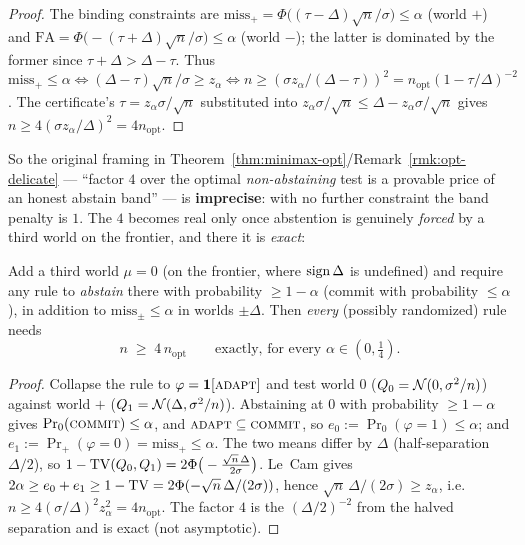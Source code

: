 \begin{proof}
The binding constraints are $\mathrm{miss}_+=\Phi\big((\tau-\Delta)\sqrt n/\sigma\big)\le\alpha$
(world $+$) and $\mathrm{FA}=\Phi\big(-(\tau+\Delta)\sqrt n/\sigma\big)\le\alpha$ (world $-$); the
latter is dominated by the former since $\tau+\Delta>\Delta-\tau$. Thus
$\mathrm{miss}_+\le\alpha\iff(\Delta-\tau)\sqrt n/\sigma\ge z_\alpha\iff
n\ge(\sigma z_\alpha/(\Delta-\tau))^2=n_{\mathrm{opt}}(1-\tau/\Delta)^{-2}$. The certificate's
$\tau=z_\alpha\sigma/\sqrt n$ substituted into $z_\alpha\sigma/\sqrt n\le\Delta-z_\alpha\sigma/
\sqrt n$ gives $n\ge 4(\sigma z_\alpha/\Delta)^2=4n_{\mathrm{opt}}$.
\end{proof}

So the original framing in Theorem~\ref{thm:minimax-opt}/Remark~\ref{rmk:opt-delicate} ---
``factor $4$ over the optimal \emph{non-abstaining} test is a provable price of an honest
abstain band'' --- is \textbf{imprecise}: with no further constraint the band penalty is $1$.
The $4$ becomes real only once abstention is genuinely \emph{forced} by a third world on the
frontier, and there it is \emph{exact}:

\begin{proposition}
\label{prop:t1b-3world}
Add a third world $\mu=0$ (on the frontier, where $\operatorname{sign}\Delta$ is undefined) and require any
rule to \emph{abstain} there with probability $\ge1-\alpha$ (commit with probability $\le\alpha$),
in addition to $\mathrm{miss}_\pm\le\alpha$ in worlds $\pm\Delta$. Then \emph{every} (possibly
randomized) rule needs
\[
   n\;\ge\;4\,n_{\mathrm{opt}}\qquad\text{exactly, for every }\alpha\in(0,\tfrac14).
\]
\end{proposition}

\begin{proof}
Collapse the rule to $\varphi=\mathbf 1[\textsc{adapt}]$ and test world $0$ ($Q_0=\mathcal N(0,
\sigma^2/n)$) against world $+$ ($Q_1=\mathcal N(\Delta,\sigma^2/n)$). Abstaining at $0$ with
probability $\ge1-\alpha$ gives $\Pr_0(\textsc{commit})\le\alpha$, and $\textsc{adapt}\subseteq
\textsc{commit}$, so $e_0:=\Pr_0(\varphi=1)\le\alpha$; and $e_1:=\Pr_+(\varphi=0)=
\mathrm{miss}_+\le\alpha$. The two means differ by $\Delta$ (half-separation $\Delta/2$), so
$1-\mathrm{TV}(Q_0,Q_1)=2\Phi\big(-\tfrac{\sqrt n\,\Delta}{2\sigma}\big)$. Le~Cam gives
$2\alpha\ge e_0+e_1\ge 1-\mathrm{TV}=2\Phi(-\sqrt n\,\Delta/(2\sigma))$, hence $\sqrt n\,\Delta/(2\sigma)
\ge z_\alpha$, i.e.\ $n\ge 4(\sigma/\Delta)^2z_\alpha^2=4n_{\mathrm{opt}}$. The factor $4$ is the
$(\Delta/2)^{-2}$ from the halved separation and is exact (not asymptotic).
\end{proof}

